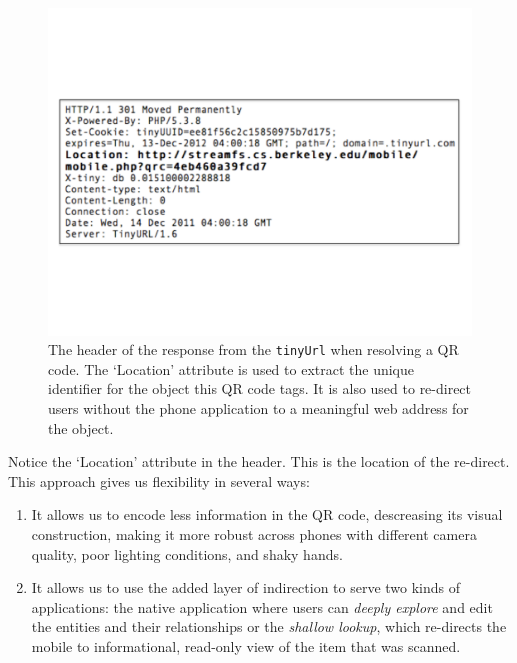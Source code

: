 \begin{figure}[htb!]
\begin{center}
\includegraphics[scale=0.30]{figs/tinyurlhdr}
\caption{The header of the response from the {\tt tinyUrl} when resolving a QR code.  The `Location' attribute
is used to extract the unique identifier for the object this QR code tags.  It is also used to re-direct
users without the phone application to a meaningful web address for the object.}
\label{fig:tinyurlhdr}
\end{center}
\end{figure}


Notice the `Location' attribute in the header.  This is the location of the re-direct.  This approach gives us
flexibility in several ways:
\begin{enumerate}
\item It allows us to encode less information in the QR code, descreasing its visual construction, making it more
		robust across phones with different camera quality, poor lighting conditions, and shaky hands.
\item It allows us to use the added layer of indirection to serve two kinds of applications:  the native application
		where users can \emph{deeply explore} and edit the entities and their relationships or the \emph{shallow lookup}, 
		which re-directs the mobile to informational, read-only view of the item that was scanned.
\end{enumerate}



